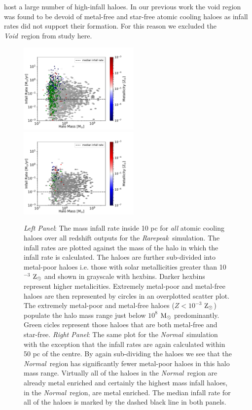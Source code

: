 \documentclass[graphics, twocolumn, usenatbib]{mn2e}
\newcommand{\msolar} {$\rm{M_{\odot}}~$}
\newcommand{\zsolar} {$\rm{Z_{\odot}}~$}
\newcommand{\zsolarc} {$\rm{Z_{\odot}}$}
\newcommand{\rarepeak} {\textit{Rarepeak~}}
\newcommand{\normal} {\textit{Normal~}}
\newcommand{\void} {\textit{Void~}}
\begin{document}
host a large number of high-infall haloes. In our previous work
\citep{Wise_2019, Regan_2019} the void region was found to be devoid of metal-free and
star-free atomic cooling haloes as infall rates
did not support their formation. For this reason we excluded the 
\void region from study here. 
\begin{figure}
\centering
\begin{minipage}{175mm}      \begin{center} 
\centerline{
\includegraphics[width=0.525\textwidth]{FIGURES/Rarepeak_MdotMHaloZ_Hexbin.pdf}
\includegraphics[width=0.525\textwidth]{FIGURES/Normal_MdotMHaloZ_Hexbin.pdf}}
\caption{\textit{Left Panel}: The mass infall rate inside 10 pc for \textit{all} atomic
  cooling haloes over all redshift outputs for the \rarepeak simulation. The infall rates
  are plotted against the mass of the halo in which the infall rate is
  calculated. The haloes are further sub-divided into metal-poor  haloes
  i.e. those with solar metallicities greater than 10$^{-3}$ \zsolar and shown in grayscale with
  hexbins. Darker hexbins represent higher metalicities. Extremely metal-poor and metal-free
  haloes are then represented by circles in an overplotted scatter plot. The extremely metal-poor
  and metal-free haloes ($Z < 10^{-3}$ \zsolarc) populate the halo mass range just below $10^{8}$
  \msolar predominantly.
  Green cicles represent those haloes that are both metal-free and star-free. 
  \textit{Right Panel}: The same plot for the \normal simulation with the exception that the infall
  rates are again calculated within 50 pc of the centre. By again sub-dividing the haloes we see
  that the \normal region has significantly fewer metal-poor haloes in this halo mass range.
  Virtually all of the haloes in the \normal region are already metal enriched and certainly the
  highest mass infall haloes, in the \normal region, are metal enriched. 
  The median infall rate for all of the haloes is marked by the dashed black line in both panels.}
\label{Fig:HaloMass}
\end{center} \end{minipage}


\end{figure}
\end{document}
